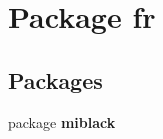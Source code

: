 \section{Package fr}
\label{namespacefr}
\subsection*{Packages}
\begin{DoxyCompactItemize}
\item 
package {\bf miblack}
\end{DoxyCompactItemize}
